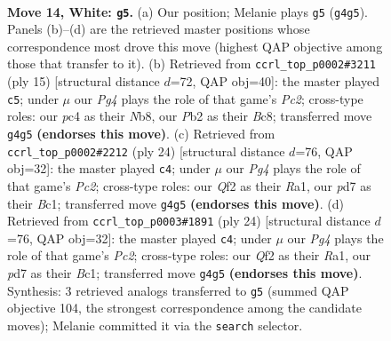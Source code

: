 \documentclass[11pt]{article}
\begin{document}
\clearpage

\begin{figure}[p]\centering
\begin{subfigure}{0.46\textwidth}\centering
\resizebox{\linewidth}{!}{%
\newchessgame
\chessboard[
  setfen={2r1kbnr/pb1p1ppp/4q3/2p1P3/2p2PPP/2P4R/PP3Q2/RNB1KB2 w Qk - 0 14},
  showmover=false,
  pgfstyle=straightmove, color=movearrow, markmove={g4-g5}
]}
\caption{}
\end{subfigure}\hfill
\begin{subfigure}{0.46\textwidth}\centering
\resizebox{\linewidth}{!}{%
\newchessgame
\chessboard[
  setfen={rnbqkb1r/1pp3pp/p3p3/3p2P1/3PpB2/4PP2/PPP4P/R2QKBNR b KQkq - 0 8},
  showmover=false,
  pgfstyle=straightmove, color=movearrow, markmove={c7-c5}
]}
\caption{}
\end{subfigure}
\\[4pt]
\begin{subfigure}{0.46\textwidth}\centering
\resizebox{\linewidth}{!}{%
\newchessgame
\chessboard[
  setfen={r1b1k2r/3p1ppp/pp2p3/2qnP3/P4P2/8/1PPQ2PP/R1B1KB1R w KQkq - 0 13},
  showmover=false,
  pgfstyle=straightmove, color=movearrow, markmove={c2-c4}
]}
\caption{}
\end{subfigure}\hfill
\begin{subfigure}{0.46\textwidth}\centering
\resizebox{\linewidth}{!}{%
\newchessgame
\chessboard[
  setfen={r1b1k2r/3p1ppp/pp2p3/2qnP3/P4P2/8/1PPQ2PP/R1B1KB1R w KQkq - 0 13},
  showmover=false,
  pgfstyle=straightmove, color=movearrow, markmove={c2-c4}
]}
\caption{}
\end{subfigure}
\caption{\textbf{Move 14, White: \texttt{g5}.} (a) Our position; Melanie plays \texttt{g5} (\texttt{g4g5}). Panels (b)--(d) are the retrieved master positions whose correspondence most drove this move (highest QAP objective among those that transfer to it). (b) Retrieved from \texttt{ccrl\_top\_p0002\#3211} (ply 15) [structural distance $d$=72, QAP obj=40]: the master played \texttt{c5}; under $\mu$ our \emph{Pg4} plays the role of that game's \emph{Pc2}; cross-type roles: our \emph{p}c4 as their \emph{N}b8, our \emph{P}b2 as their \emph{B}c8; transferred move \texttt{g4g5} \textbf{(endorses this move)}. (c) Retrieved from \texttt{ccrl\_top\_p0002\#2212} (ply 24) [structural distance $d$=76, QAP obj=32]: the master played \texttt{c4}; under $\mu$ our \emph{Pg4} plays the role of that game's \emph{Pc2}; cross-type roles: our \emph{Q}f2 as their \emph{R}a1, our \emph{p}d7 as their \emph{B}c1; transferred move \texttt{g4g5} \textbf{(endorses this move)}. (d) Retrieved from \texttt{ccrl\_top\_p0003\#1891} (ply 24) [structural distance $d$=76, QAP obj=32]: the master played \texttt{c4}; under $\mu$ our \emph{Pg4} plays the role of that game's \emph{Pc2}; cross-type roles: our \emph{Q}f2 as their \emph{R}a1, our \emph{p}d7 as their \emph{B}c1; transferred move \texttt{g4g5} \textbf{(endorses this move)}. Synthesis: 3 retrieved analogs transferred to \texttt{g5} (summed QAP objective 104, the strongest correspondence among the candidate moves); Melanie committed it via the \texttt{search} selector.}
\label{fig:thought-m26}
\end{figure}
\end{document}
